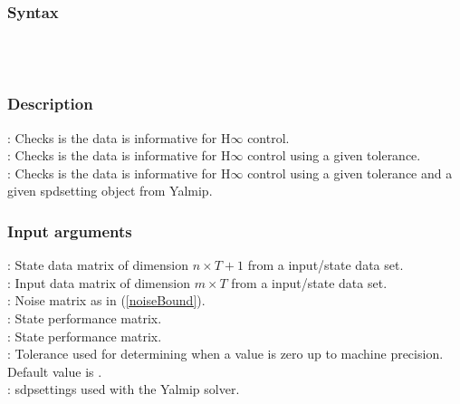 \subsubsection*{Syntax} 
 \\
 \\

\subsubsection*{Description}
\mon{[[bool, K, diagnostics, gamma, info] = isInformHInf(X, U, Phi, C, D)}: Checks is the data is informative for \mbox{H$\infty$} control. \\
: Checks is the data is informative for \mbox{H$\infty$} control using a given tolerance. \\
: Checks is the data is informative for \mbox{H$\infty$} control using a given tolerance and a given spdsetting object from Yalmip.

\subsubsection*{Input arguments}
\textbf{}: State data matrix of dimension $n \times T+1$ from a input/state data set.\\
\textbf{}: Input data matrix of dimension $m \times T$ from a input/state data set.\\
\textbf{}: Noise matrix as in (\ref{noiseBound}). \\ 
\textbf{}: State performance matrix. \\ 
\textbf{}: State performance matrix. \\ 
\textbf{}: Tolerance used for determining when a value is zero up to machine precision. Default value is .\\
\textbf{}: sdpsettings used with the Yalmip solver.

